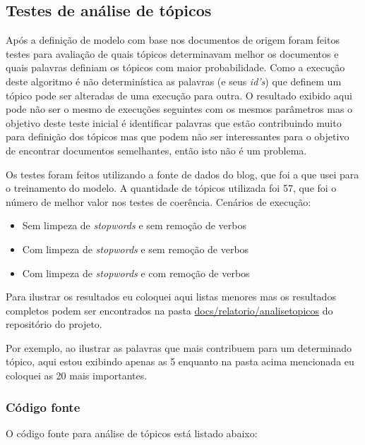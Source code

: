 \subsection{Testes de análise de tópicos}

Após a definição de modelo com base nos documentos de origem foram feitos testes para avaliação de quais tópicos determinavam melhor os documentos e quais 
palavras definiam os tópicos com maior probabilidade. Como a execução deste algoritmo é não determinística as palavras (e seus \textit{id's}) que definem 
um tópico pode ser alteradas de uma execução para outra. O resultado exibido aqui pode não ser o mesmo de execuções seguintes com os mesmos parâmetros mas 
o objetivo deste teste inicial é identificar palavras que estão contribuindo muito para definição dos tópicos mas que podem não ser interessantes 
para o objetivo de encontrar documentos semelhantes, então isto não é um problema.

Os testes foram feitos utilizando a fonte de dados do blog, que foi a que usei para o treinamento do modelo. A quantidade de tópicos utilizada foi 
57, que foi o número de melhor valor nos testes de coerência.
Cenários de execução:

\begin{itemize}
    \item Sem limpeza de \textit{stopwords} e sem remoção de verbos
    \item Com limpeza de \textit{stopwords} e sem remoção de verbos
    \item Com limpeza de \textit{stopwords} e com remoção de verbos
\end{itemize}

Para ilustrar os resultados eu coloquei aqui listas menores mas os resultados completos podem ser encontrados na pasta 
\href{https://github.com/heldergr/tcc-pucmg-2/tree/main/src/python/docs/relatorio/analisetopicos}{docs/relatorio/analisetopicos} do repositório do projeto.

Por exemplo, ao ilustrar as palavras que mais contribuem para um determinado tópico, aqui estou exibindo apenas as 5 enquanto na pasta acima mencionada eu 
coloquei as 20 mais importantes.

\subsubsection{Código fonte}

O código fonte para análise de tópicos está listado abaixo:

